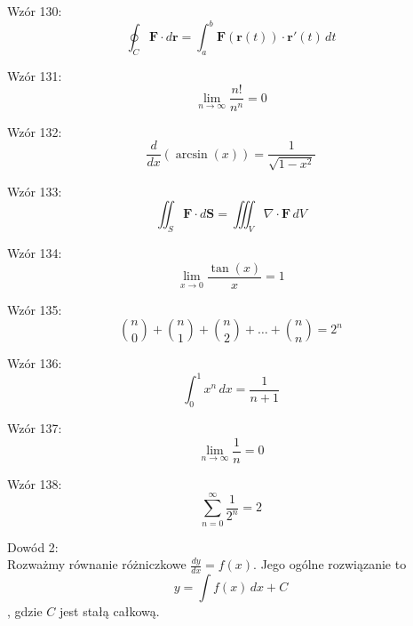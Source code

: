 \documentclass{article}
\begin{document}
Wzór 130:
\[ \oint_C \mathbf{F} \cdot d\mathbf{r} = \int_{a}^{b} \mathbf{F}(\mathbf{r}(t)) \cdot \mathbf{r}'(t) \,dt \]

Wzór 131:
\[ \lim_{{n \to \infty}} \frac{n!}{n^n} = 0 \]

Wzór 132:
\[ \frac{d}{dx}\left(\arcsin(x)\right) = \frac{1}{\sqrt{1-x^2}} \]

Wzór 133:
\[ \iint_S \mathbf{F} \cdot d\mathbf{S} = \iiint_V \nabla \cdot \mathbf{F} \,dV \]

Wzór 134:
\[ \lim_{{x \to 0}} \frac{\tan(x)}{x} = 1 \]

Wzór 135:
\[ \binom{n}{0} + \binom{n}{1} + \binom{n}{2} + \ldots + \binom{n}{n} = 2^n \]

Wzór 136:
\[ \int_{0}^{1} x^n \,dx = \frac{1}{n+1} \]

Wzór 137:
\[ \lim_{{n \to \infty}} \frac{1}{n} = 0 \]

Wzór 138:
\[ \sum_{n=0}^{\infty} \frac{1}{2^n} = 2 \]

Dowód 2: \\
Rozważmy równanie różniczkowe \( \frac{dy}{dx} = f(x) \). Jego ogólne rozwiązanie to
\[ y = \int f(x) \,dx + C \],
gdzie \( C \) jest stałą całkową.
\end{document}

